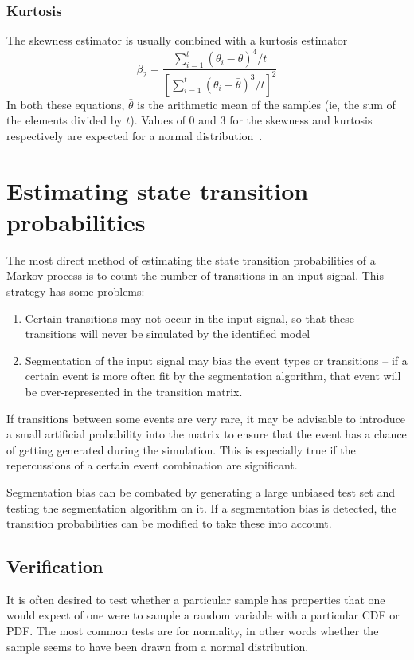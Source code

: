 \subsubsection{Kurtosis}
The skewness estimator is usually combined with a kurtosis estimator 
\begin{equation} 
  \beta_2 =
  \frac{\displaystyle\sum_{i=1}^t \left ( \theta_i - \bar{\theta} \right
    )^4/t} { \left [ \displaystyle\sum_{i=1}^t \left(
        \theta_i-\bar{\theta} \right)^3/t \right]^2} 
\end{equation}
%
In both these equations, $\bar{\theta}$ is the arithmetic mean of the
samples (ie, the sum of the elements divided by $t$).  Values of 0 and
3 for the skewness and kurtosis respectively are expected for a normal
distribution~\citep{kleijnen1975statistical}.

\section{Estimating state transition probabilities}
The most direct method of estimating the state transition probabilities of a Markov process is to count the number of transitions in an input signal.
This strategy has some problems:
\begin{enumerate}
\item Certain transitions may not occur in the input signal, so that these transitions will never be simulated by the identified model
\item Segmentation of the input signal may bias the event types or transitions -- if a certain event is more often fit by the segmentation algorithm, that event will be over-represented in the transition matrix.
\end{enumerate}

If transitions between some events are very rare, it may be advisable to introduce a small artificial probability into the matrix to ensure that the event has a chance of  getting generated during the simulation.
This is especially true if the repercussions of a certain event combination are significant.  

Segmentation bias can be combated by generating a large unbiased test set and testing the segmentation algorithm on it.
If a segmentation bias is detected, the transition probabilities can be modified to take these into account.


\subsection{Verification}
It is often desired to test whether a particular sample has properties that one would expect of one were to sample a random variable with a particular CDF or PDF.
The most common tests are for normality, in other words whether the sample seems to have been drawn from a normal distribution.

